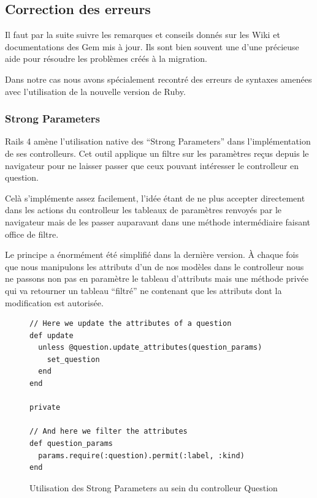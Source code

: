 \documentclass[12pt,a4paper]{book}
\begin{document}
\subsection{Correction des erreurs}

Il faut par la suite suivre les remarques et conseils donnés sur les Wiki et documentations des Gem mis à jour. Ils sont bien souvent une d'une précieuse aide pour résoudre les problèmes créés à la migration. 

Dans notre cas nous avons spécialement recontré des erreurs de syntaxes amenées avec l'utilisation de la nouvelle version de Ruby.

\subsubsection{Strong Parameters}

Rails 4 amène l'utilisation native des ``Strong Parameters'' dans l'implémentation de ses controlleurs. Cet outil applique un filtre sur les paramètres reçus depuis le navigateur pour ne laisser passer que ceux pouvant intéresser le controlleur en question.

Celà s'implémente assez facilement, l'idée étant de ne plus accepter directement dans les actions du controlleur les tableaux de paramètres renvoyés par le navigateur mais de les passer auparavant dans une méthode intermédiaire faisant office de filtre.

Le principe a énormément été simplifié dans la dernière version. À chaque fois que nous manipulons les attributs d'un de nos modèles dans le controlleur nous ne passons non pas en paramètre le tableau d'attributs mais une méthode privée qui va retourner un tableau ``filtré'' ne contenant que les attributs dont la modification est autorisée.

    \begin{figure}[h]
    \lstset{language=ruby}
    \begin{lstlisting}
// Here we update the attributes of a question
def update
  unless @question.update_attributes(question_params)
    set_question
  end
end

private

// And here we filter the attributes 
def question_params
  params.require(:question).permit(:label, :kind)
end
    \end{lstlisting}
     \caption{Utilisation des Strong Parameters au sein du controlleur Question}
    \end{figure}
    
\end{document}
